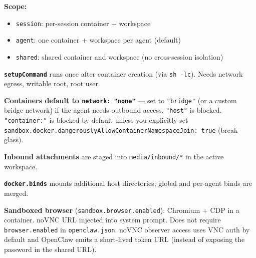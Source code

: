 \textbf{Scope:}

\begin{itemize}
  \item \texttt{session}: per-session container + workspace
  \item \texttt{agent}: one container + workspace per agent (default)
  \item \texttt{shared}: shared container and workspace (no cross-session isolation)
\end{itemize}


\textbf{\texttt{setupCommand}} runs once after container creation (via \texttt{sh -lc}). Needs network egress, writable root, root user.

\textbf{Containers default to \texttt{network: "none"}} — set to \texttt{"bridge"} (or a custom bridge network) if the agent needs outbound access.
\texttt{"host"} is blocked. \texttt{"container:"} is blocked by default unless you explicitly set
\texttt{sandbox.docker.dangerouslyAllowContainerNamespaceJoin: true} (break-glass).

\textbf{Inbound attachments} are staged into \texttt{media/inbound/*} in the active workspace.

\textbf{\texttt{docker.binds}} mounts additional host directories; global and per-agent binds are merged.

\textbf{Sandboxed browser} (\texttt{sandbox.browser.enabled}): Chromium + CDP in a container. noVNC URL injected into system prompt. Does not require \texttt{browser.enabled} in \texttt{openclaw.json}.
noVNC observer access uses VNC auth by default and OpenClaw emits a short-lived token URL (instead of exposing the password in the shared URL).

